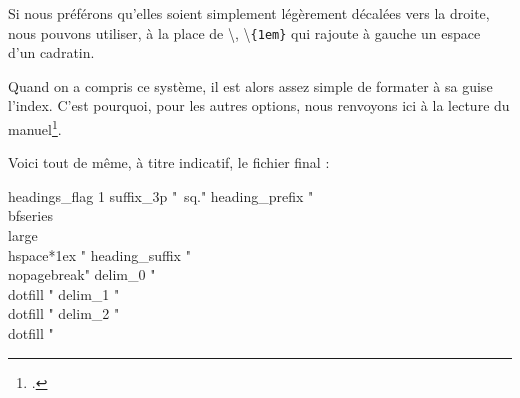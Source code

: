 Si nous préférons qu'elles soient simplement légèrement décalées vers la droite, nous pouvons utiliser, à la place de \textbackslash{}, \textbackslash{}\verb|{1em}| qui rajoute à gauche un espace d'un cadratin. 


Quand on a compris ce système, il est alors assez simple de formater à sa guise l'index. C'est pourquoi, pour les autres options, nous renvoyons ici à la lecture du manuel\footcite[On pourra aussi consulter][]{frama_index}. 

Voici tout de même, à titre indicatif, le fichier final :

\begin{latexcode}
headings_flag 1
suffix_3p "~sq."
heading_prefix "{\\bfseries\\large\\hspace*{1ex} " 
heading_suffix " }\\nopagebreak\n" 
delim_0 "\\dotfill "
delim_1 "\\dotfill "
delim_2 "\\dotfill "
\end{latexcode}




